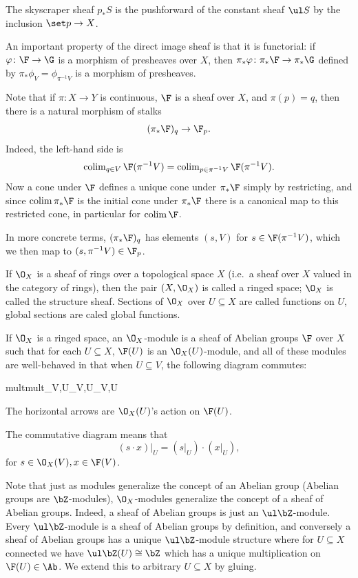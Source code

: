     The skyscraper sheaf $p_*S$ is the pushforward of the constant sheaf $\ul S$ by the inclusion $\set p\to X$.

    An important property of the direct image sheaf is that it is functorial: if $\phi\colon\F\to\G$ is a morphism of presheaves over $X$,
    then $\pi_*\phi\colon\pi_*\F\to\pi_*\G$ defined by $\pi_*\phi_V=\phi_{\pi^{-1}V}$ is a morphism of presheaves.

\eexam

Note that if $\pi\colon X\to Y$ is continuous, $\F$ is a sheaf over $X$, and $\pi(p)=q$, then there is a natural morphism of stalks
$$ (\pi_*\F)_q \to \F_p . $$
Indeed, the left-hand side is
$$ \colim_{q\in V}\F(\pi^{-1}V) = \colim_{p\in\pi^{-1}V}\F(\pi^{-1}V) . $$
Now a cone under $\F$ defines a unique cone under $\pi_*\F$ simply by restricting, and since $\colim\pi_*\F$ is the initial cone under $\pi_*\F$
there is a canonical map to this restricted cone, in particular for $\colim\F$.

In more concrete terms, $(\pi_*\F)_q$ has elements $(s,V)$ for $s\in\F(\pi^{-1}V)$, which we then map to $(s,\pi^{-1}V)\in\F_p$.

\bdefn

    If $\O_X$ is a sheaf of rings over a topological space $X$ (i.e.\ a sheaf over $X$ valued in the category of rings), then the pair
    $(X,\O_X)$ is called a {\emphcolor ringed space}; $\O_X$ is called the {\emphcolor structure sheaf}.
    Sections of $\O_X$ over $U\subseteq X$ are called {\emphcolor functions} on $U$, global sections are caled {\emphcolor global functions}.

\edefn

\bdefn[name={sheafmod}]

    If $\O_X$ is a ringed space, an {\emphcolor $\O_X$-module} is a sheaf of Abelian groups $\F$ over $X$ such that for each $U\subseteq X$,
    $\F(U)$ is an $\O_X(U)$-module, and all of these modules are well-behaved in that when $U\subseteq V$, the following diagram commutes:

        {{\rm mult}}{{\rm mult}}{\res_{V,U}\times\res_{V,U}}{\res_{V,U}}

    The horizontal arrows are $\O_X(U)$'s action on $\F(U)$.

\edefn

The commutative diagram means that
$$ (s\cdot x)|_U = (s|_U)\cdot(x|_U) , $$
for $s\in\O_X(V),x\in\F(V)$.

Note that just as modules generalize the concept of an Abelian group (Abelian groups are $\bZ$-modules), $\O_X$-modules generalize the concept
of a sheaf of Abelian groups.
Indeed, a sheaf of Abelian groups is just an $\ul\bZ$-module.
Every $\ul\bZ$-module is a sheaf of Abelian groups by definition, and conversely a sheaf of Abelian groups has a unique $\ul\bZ$-module structure
where for $U\subseteq X$ connected we have $\ul\bZ(U)\cong\bZ$ which has a unique multiplication on $\F(U)\in\Ab$.
We extend this to arbitrary $U\subseteq X$ by gluing.

